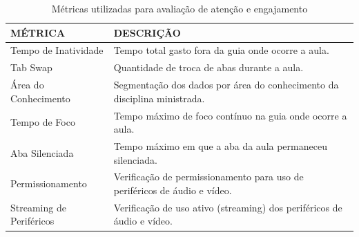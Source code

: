 \begin{table}[H]
    \centering
    \caption{Métricas utilizadas para avaliação de atenção e engajamento}
    \label{tab:table1}
     \begin{tabular}{|l|p{10cm}|}
        \hline
        \textbf{MÉTRICA}         & \textbf{DESCRIÇÃO} \\
        \hline
        Tempo de Inatividade     & Tempo total gasto fora da guia onde ocorre a aula.                        \\
        \hline
        Tab Swap                 & Quantidade de troca de abas durante a aula.                               \\
        \hline
        Área do Conhecimento     & Segmentação dos dados por área do
        conhecimento da disciplina ministrada.                                                               \\
        \hline
        Tempo de Foco            & Tempo máximo de foco contínuo na guia onde ocorre a aula.                 \\
        \hline
        Aba Silenciada           & Tempo máximo em que a aba da aula permaneceu silenciada.                  \\
        \hline
        Permissionamento         & Verificação de permissionamento para uso de periféricos de áudio e vídeo. \\
        \hline
        Streaming de Periféricos & Verificação de uso ativo (streaming) dos periféricos de áudio e vídeo.    \\
        \hline
    \end{tabular}
\end{table}


